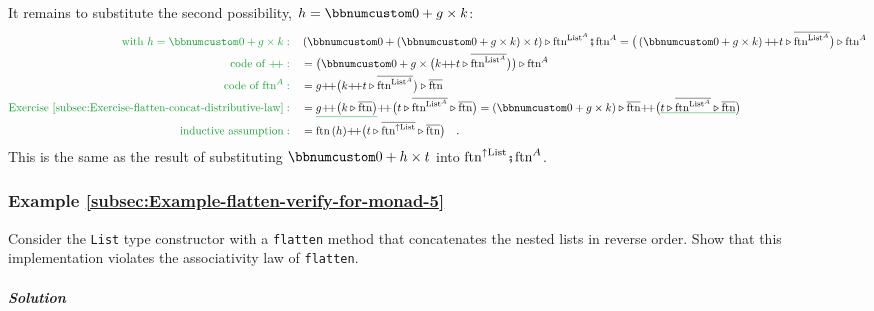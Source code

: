 It remains to substitute the second possibility, $h=\bbnum 0+g\times k$:
\begin{align*}
{\color{greenunder}\text{with }h=\bbnum 0+g\times k:}\quad & \left(\bbnum 0+\left(\bbnum 0+g\times k\right)\times t\right)\triangleright\text{ftn}^{\text{List}^{A}}\bef\text{ftn}^{A}=\big(\left(\bbnum 0+g\times k\right)\pplus t\triangleright\overline{\text{ftn}^{\text{List}^{A}}}\big)\triangleright\text{ftn}^{A}\\
{\color{greenunder}\text{code of }\pplus:}\quad & =\big(\bbnum 0+g\times\big(k\pplus t\triangleright\overline{\text{ftn}^{\text{List}^{A}}}\big)\big)\triangleright\text{ftn}^{A}\\
{\color{greenunder}\text{code of }\text{ftn}^{A}:}\quad & =g\pplus\big(k\pplus t\triangleright\overline{\text{ftn}^{\text{List}^{A}}}\big)\triangleright\overline{\text{ftn}}\\
{\color{greenunder}\text{Exercise~\ref{subsec:Exercise-flatten-concat-distributive-law}}:}\quad & =\gunderline{g\pplus\big(k\triangleright\overline{\text{ftn}}\big)}\pplus\big(t\triangleright\overline{\text{ftn}^{\text{List}^{A}}}\triangleright\overline{\text{ftn}}\big)=\left(\bbnum 0+g\times k\right)\triangleright\overline{\text{ftn}}\pplus\big(\gunderline{t\triangleright\overline{\text{ftn}^{\text{List}^{A}}}\triangleright\overline{\text{ftn}}}\big)\\
{\color{greenunder}\text{inductive assumption}:}\quad & =\text{ftn}\,(h)\pplus\big(t\triangleright\overline{\text{ftn}^{\uparrow\text{List}}}\triangleright\overline{\text{ftn}}\big)\quad.
\end{align*}
This is the same as the result of substituting $\bbnum 0+h\times t$
into $\text{ftn}^{\uparrow\text{List}}\bef\text{ftn}^{A}$.

\subsubsection{Example \label{subsec:Example-flatten-verify-for-monad-5}\ref{subsec:Example-flatten-verify-for-monad-5}}

Consider the \lstinline!List! type constructor with a \lstinline!flatten!
method that concatenates the nested lists in reverse order. Show that
this implementation violates the associativity law of \lstinline!flatten!.

\subparagraph{Solution}


